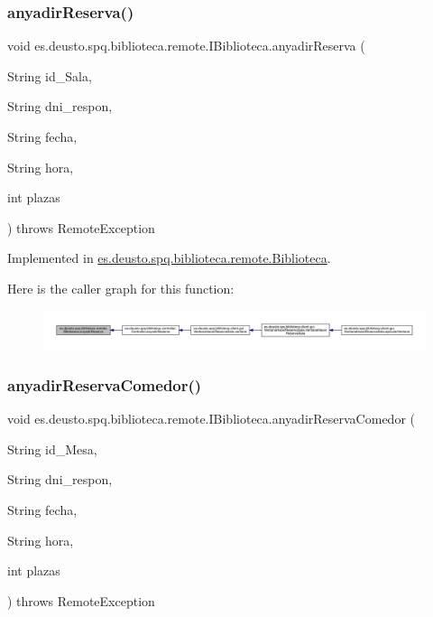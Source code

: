 \subsubsection{\texorpdfstring{anyadir\+Reserva()}{anyadirReserva()}}
{\footnotesize\ttfamily void es.\+deusto.\+spq.\+biblioteca.\+remote.\+I\+Biblioteca.\+anyadir\+Reserva (\begin{DoxyParamCaption}\item[{String}]{id\+\_\+\+Sala,  }\item[{String}]{dni\+\_\+respon,  }\item[{String}]{fecha,  }\item[{String}]{hora,  }\item[{int}]{plazas }\end{DoxyParamCaption}) throws Remote\+Exception}



Implemented in \mbox{\hyperlink{classes_1_1deusto_1_1spq_1_1biblioteca_1_1remote_1_1_biblioteca_a14548a38ca53ad1037d16687093e4597}{es.\+deusto.\+spq.\+biblioteca.\+remote.\+Biblioteca}}.

Here is the caller graph for this function\+:
\nopagebreak
\begin{figure}[H]
\begin{center}
\leavevmode
\includegraphics[width=350pt]{interfacees_1_1deusto_1_1spq_1_1biblioteca_1_1remote_1_1_i_biblioteca_a4d0efe1c5a592db92d9b416f59ac8d9a_icgraph}
\end{center}
\end{figure}
\mbox{\label{interfacees_1_1deusto_1_1spq_1_1biblioteca_1_1remote_1_1_i_biblioteca_a6e1aadce8e2f541702117bf54ed6a225}} 
\subsubsection{\texorpdfstring{anyadir\+Reserva\+Comedor()}{anyadirReservaComedor()}}
{\footnotesize\ttfamily void es.\+deusto.\+spq.\+biblioteca.\+remote.\+I\+Biblioteca.\+anyadir\+Reserva\+Comedor (\begin{DoxyParamCaption}\item[{String}]{id\+\_\+\+Mesa,  }\item[{String}]{dni\+\_\+respon,  }\item[{String}]{fecha,  }\item[{String}]{hora,  }\item[{int}]{plazas }\end{DoxyParamCaption}) throws Remote\+Exception}



